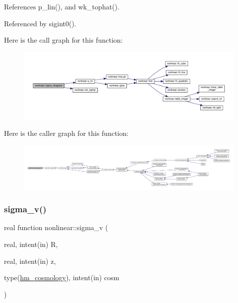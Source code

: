 References p\+\_\+lin(), and wk\+\_\+tophat().



Referenced by sigint0().

Here is the call graph for this function\+:
\nopagebreak
\begin{figure}[H]
\begin{center}
\leavevmode
\includegraphics[width=350pt]{namespacenonlinear_a752ac5f748fd7d780ac59ee3a8b4d267_cgraph}
\end{center}
\end{figure}
Here is the caller graph for this function\+:
\nopagebreak
\begin{figure}[H]
\begin{center}
\leavevmode
\includegraphics[width=350pt]{namespacenonlinear_a752ac5f748fd7d780ac59ee3a8b4d267_icgraph}
\end{center}
\end{figure}
\mbox{\label{namespacenonlinear_a66f93056c25bc48a5cfb206e596b47ad}} 
\subsubsection{\texorpdfstring{sigma\+\_\+v()}{sigma\_v()}}
{\footnotesize\ttfamily real function nonlinear\+::sigma\+\_\+v (\begin{DoxyParamCaption}\item[{real, intent(in)}]{R,  }\item[{real, intent(in)}]{z,  }\item[{type(\mbox{\hyperlink{structnonlinear_1_1hm__cosmology}{hm\+\_\+cosmology}}), intent(in)}]{cosm }\end{DoxyParamCaption})\hspace{0.3cm}{\ttfamily [private]}}




